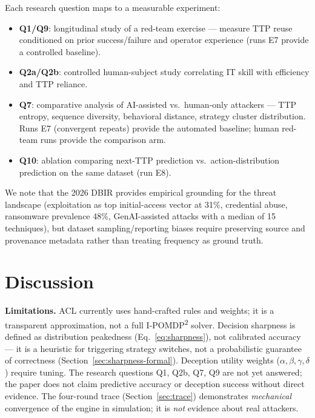 \documentclass[preprints,article,accept,oneauthor]{Definitions/mdpi}
\begin{document}
Each research question maps to a measurable experiment:
\begin{itemize}
\item \textbf{Q1/Q9}: longitudinal study of a red-team exercise --- measure
      TTP reuse conditioned on prior success/failure and operator
      experience (runs E7 provide a controlled baseline).
\item \textbf{Q2a/Q2b}: controlled human-subject study correlating IT skill
      with efficiency and TTP reliance.
\item \textbf{Q7}: comparative analysis of AI-assisted vs.\ human-only
      attackers --- TTP entropy, sequence diversity, behavioral distance,
      strategy cluster distribution. Runs E7 (convergent repeats) provide
      the automated baseline; human red-team runs provide the comparison
      arm.
\item \textbf{Q10}: ablation comparing next-TTP prediction vs.\
      action-distribution prediction on the same dataset (run E8).
\end{itemize}
We note that the 2026 DBIR \citep{dbir2026} provides empirical grounding for
the threat landscape (exploitation as top initial-access vector at 31\%,
credential abuse, ransomware prevalence 48\%, GenAI-assisted attacks with a
median of 15 techniques), but dataset sampling/reporting biases require
preserving source and provenance metadata rather than treating frequency as
ground truth.

\section{Discussion}
\label{sec:discussion}

\textbf{Limitations.} ACL currently uses hand-crafted rules and weights; it
is a transparent approximation, not a full I-POMDP\textsuperscript{2}
solver. Decision sharpness is defined as distribution peakedness
(Eq.~\ref{eq:sharpness}), not calibrated accuracy --- it is a heuristic for
triggering strategy switches, not a probabilistic guarantee of correctness
(Section~\ref{sec:sharpness-formal}). Deception utility weights
($\alpha,\beta,\gamma,\delta$) require tuning. The research questions Q1,
Q2b, Q7, Q9 are not yet answered; the paper does not claim predictive
accuracy or deception success without direct evidence. The four-round trace
(Section~\ref{sec:trace}) demonstrates \textit{mechanical} convergence of the
engine in simulation; it is \textit{not} evidence about real attackers.
\end{document}

